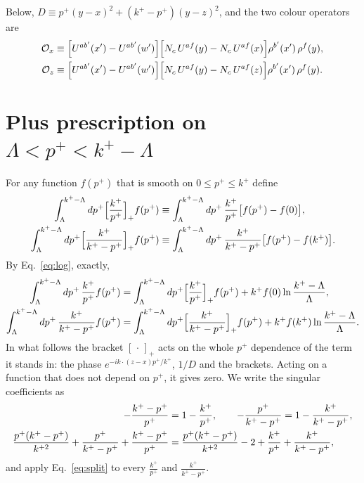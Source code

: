 \documentclass[10pt]{article}
\begin{document}
Below, $D\equiv p^{+}(y-x)^{2}+(k^{+}-p^{+})(y-z)^{2}$, and the two colour operators are
\begin{align}
{\cal O}_x&\equiv\Big[U^{ab'}(x')-U^{ab'}(w')\Big]\Big[N_{c}\,U^{af}(y)-N_{c}\,U^{af}(x)\Big]\rho^{b'}(x')\,\rho^{f}(y),\notag\\
{\cal O}_z&\equiv\Big[U^{ab'}(x')-U^{ab'}(w')\Big]\Big[N_{c}\,U^{af}(y)-N_{c}\,U^{af}(z)\Big]\rho^{b'}(x')\,\rho^{f}(y).
\end{align}

\section{Plus prescription on \texorpdfstring{$\Lambda<p^+<k^+-\Lambda$}{Lambda < p+ < k+ - Lambda}}
For any function $f(p^+)$ that is smooth on $0\le p^+\le k^+$ define
\begin{align}
\int_{\Lambda}^{k^+-\Lambda}dp^+\Big[\frac{k^+}{p^+}\Big]_+f(p^+)&\equiv\int_{\Lambda}^{k^+-\Lambda}dp^+\,\frac{k^+}{p^+}\big[f(p^+)-f(0)\big],\notag\\
\int_{\Lambda}^{k^+-\Lambda}dp^+\Big[\frac{k^+}{k^+-p^+}\Big]_+f(p^+)&\equiv\int_{\Lambda}^{k^+-\Lambda}dp^+\,\frac{k^+}{k^+-p^+}\big[f(p^+)-f(k^+)\big].
\label{eq:plusdef}
\end{align}
By Eq.~\eqref{eq:log}, exactly,
\begin{align}
\int_{\Lambda}^{k^+-\Lambda}dp^+\,\frac{k^+}{p^+}f(p^+)&=\int_{\Lambda}^{k^+-\Lambda}dp^+\Big[\frac{k^+}{p^+}\Big]_+f(p^+)+k^+f(0)\ln\frac{k^+-\Lambda}{\Lambda},\notag\\
\int_{\Lambda}^{k^+-\Lambda}dp^+\,\frac{k^+}{k^+-p^+}f(p^+)&=\int_{\Lambda}^{k^+-\Lambda}dp^+\Big[\frac{k^+}{k^+-p^+}\Big]_+f(p^+)+k^+f(k^+)\ln\frac{k^+-\Lambda}{\Lambda}.
\label{eq:split}
\end{align}
In what follows the bracket $[\,\cdot\,]_+$ acts on the whole $p^+$ dependence of the term it stands in: the phase $e^{-ik\cdot(z-x)p^+/k^+}$, $1/D$ and the brackets. Acting on a function that does not depend on $p^+$, it gives zero. We write the singular coefficients as
\begin{align}
-\frac{k^+-p^+}{p^+}&=1-\frac{k^+}{p^+},\qquad
-\frac{p^+}{k^+-p^+}=1-\frac{k^+}{k^+-p^+},\notag\\
\frac{p^{+}(k^{+}-p^{+})}{k^{+2}}+\frac{p^{+}}{k^{+}-p^{+}}+\frac{k^{+}-p^{+}}{p^{+}}&=\frac{p^{+}(k^{+}-p^{+})}{k^{+2}}-2+\frac{k^+}{p^+}+\frac{k^+}{k^+-p^+},
\end{align}
and apply Eq.~\eqref{eq:split} to every $\frac{k^+}{p^+}$ and $\frac{k^+}{k^+-p^+}$.
\end{document}
